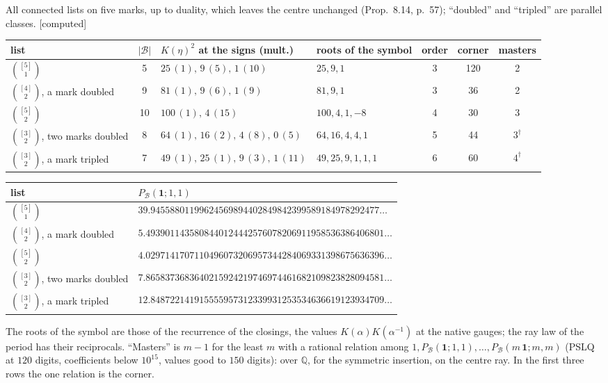\documentclass[11pt]{article}
\newcommand{\cB}{\mathcal B}
\newcommand{\one}{\mathbf 1}
\newcommand{\Pc}[1]{P_{\cB}(#1\,\one;#1,#1)}
\theoremstyle{plain}
\theoremstyle{definition}
\theoremstyle{remark}
\newcommand{\computed}{\textup{[computed]}}
\begin{document}
All connected lists on five marks, up to duality, which leaves the centre unchanged (Prop.~8.14, p.~57); ``doubled'' and ``tripled'' are parallel classes. \computed
\begin{center}
\small
\begin{tabular}{@{}l c l l c c c@{}}
\toprule
list & $|\cB|$ & $K(\eta)^2$ at the signs (mult.) & roots of the symbol & order & corner & masters\\ \midrule
$\binom{[5]}1$ & 5 & $25\,(1),\,9\,(5),\,1\,(10)$ & $25,9,1$ & 3 & 120 & 2\\
$\binom{[4]}2$, a mark doubled & 9 & $81\,(1),\,9\,(6),\,1\,(9)$ & $81,9,1$ & 3 & 36 & 2\\
$\binom{[5]}2$ & 10 & $100\,(1),\,4\,(15)$ & $100,4,1,-8$ & 4 & 30 & 3\\
$\binom{[3]}2$, two marks doubled & 8 & $64\,(1),\,16\,(2),\,4\,(8),\,0\,(5)$ & $64,16,4,4,1$ & 5 & 44 & $3^\dagger$\\
$\binom{[3]}2$, a mark tripled & 7 & $49\,(1),\,25\,(1),\,9\,(3),\,1\,(11)$ & $49,25,9,1,1,1$ & 6 & 60 & $4^\dagger$\\
\bottomrule
\end{tabular}

\medskip
\begin{tabular}{@{}l l@{}}
\toprule
list & $P_{\cB}(\one;1,1)$\\ \midrule
$\binom{[5]}1$ & $39.94558801199624569894402849842399589184978292477\ldots$\\
$\binom{[4]}2$, a mark doubled & $5.4939011435808440124442576078206911958536386406801\ldots$\\
$\binom{[5]}2$ & $4.0297141707110496073206957344284069331398675636396\ldots$\\
$\binom{[3]}2$, two marks doubled & $7.8658373683640215924219746974461682109823828094581\ldots$\\
$\binom{[3]}2$, a mark tripled & $12.848722141915555957312339931253534636619123934709\ldots$\\
\bottomrule
\end{tabular}
\end{center}
The roots of the symbol are those of the recurrence of the closings, the values $K(\alpha)K(\alpha^{-1})$ at the native gauges; the ray law of the period has their reciprocals. ``Masters'' is $m-1$ for the least $m$ with a rational relation among $1,P_{\cB}(\one;1,1),\dots,\Pc m$ (PSLQ at $120$ digits, coefficients below $10^{15}$, values good to $150$ digits): over $\mathbb Q$, for the symmetric insertion, on the centre ray. In the first three rows the one relation is the corner.
\end{document}
